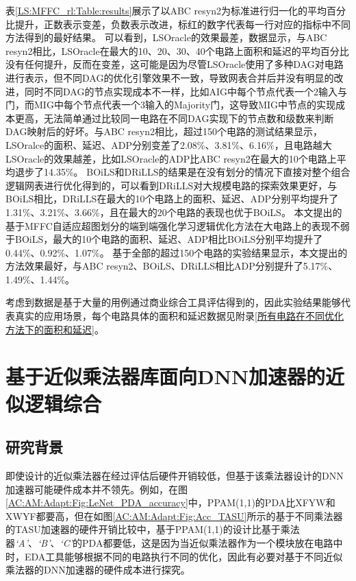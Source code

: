 表\ref{LS:MFFC_rl:Table:results}展示了以ABC resyn2为标准进行归一化的平均百分比提升，正数表示变差，负数表示改进，标红的数字代表每一行对应的指标中不同方法得到的最好结果。
可以看到，LSOracle\cite{LS:LSOracle}的效果最差，数据显示，与ABC resyn2相比，LSOracle在最大的10、20、30、40个电路上面积和延迟的平均百分比没有任何提升，反而在变差，这可能是因为尽管LSOracle使用了多种DAG对电路进行表示，但不同DAG的优化引擎效果不一致，导致网表合并后并没有明显的改进，同时不同DAG的节点实现成本不一样，比如AIG中每个节点代表一个2输入与门，而MIG中每个节点代表一个3输入的Majority门，这导致MIG中节点的实现成本更高，无法简单通过比较同一电路在不同DAG实现下的节点数和级数来判断DAG映射后的好坏。与ABC resyn2相比，超过150个电路的测试结果显示，LSOralce的面积、延迟、ADP分别变差了2.08\%、3.81\%、6.16\%，且电路越大LSOracle的效果越差，比如LSOracle的ADP比ABC resyn2在最大的10个电路上平均退步了14.35\%。
BOiLS和DRiLLS的结果是在没有划分的情况下直接对整个组合逻辑网表进行优化得到的，可以看到DRiLLS对大规模电路的探索效果更好，与BOiLS相比，DRiLLS在最大的10个电路上的面积、延迟、ADP分别平均提升了1.31\%、3.21\%、3.66\%，且在最大的20个电路的表现也优于BOiLS。
本文提出的基于MFFC自适应超图划分的端到端强化学习逻辑优化方法在大电路上的表现不弱于BOiLS，最大的10个电路的面积、延迟、ADP相比BOiLS分别平均提升了0.44\%、0.92\%、1.07\%。
基于全部的超过150个电路的实验结果显示，本文提出的方法效果最好，与ABC resyn2、BOiLS、DRiLLS相比ADP分别提升了5.17\%、1.49\%、1.44\%。

考虑到数据是基于大量的用例通过商业综合工具评估得到的，因此实验结果能够代表真实的应用场景，每个电路具体的面积和延迟数据见附录\ref{所有电路在不同优化方法下的面积和延迟}。


\section{基于近似乘法器库面向DNN加速器的近似逻辑综合}

\subsection{研究背景}

即使设计的近似乘法器在经过评估后硬件开销较低，但基于该乘法器设计的DNN加速器可能硬件成本并不领先。例如，在图\ref{AC:AM:Adapt:Fig:LeNet_PDA_accuracy}中，PPAM(1,1)的PDA比XFYW和XWYF都要高，但在如图\ref{AC:AM:Adapt:Fig:Acc_TASU}所示的基于不同乘法器的TASU加速器的\cite{Accelerator:JiaoLi}硬件开销比较中，基于PPAM(1,1)的设计比基于乘法器\emph{`A'}、\emph{`B'}、\emph{`C'}的PDA都要低，这是因为当近似乘法器作为一个模块放在电路中时，EDA工具能够根据不同的电路执行不同的优化，因此有必要对基于不同近似乘法器的DNN加速器的硬件成本进行探究。

